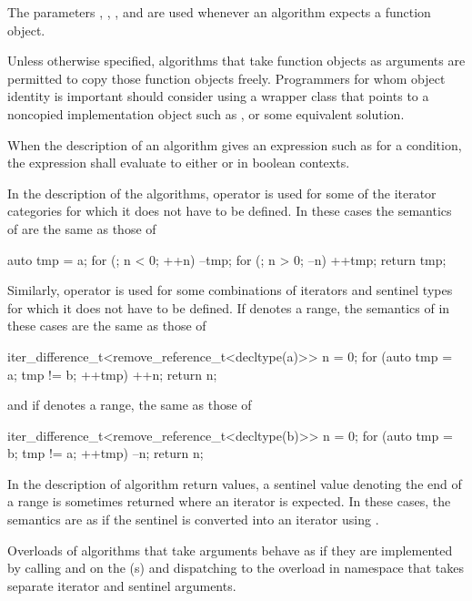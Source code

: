 \pnum
The parameters
,
,
,
and 
are used
whenever an algorithm expects a function object.

\pnum
\begin{note}
Unless otherwise specified, algorithms that take function objects as arguments
are permitted to copy those function objects freely.
Programmers for whom object identity is important should consider
using a wrapper class that points to a noncopied implementation object
such as , or some equivalent solution.
\end{note}

\pnum
When the description of an algorithm gives an expression such as
 for a condition, the expression
shall evaluate to either  or  in boolean contexts.

\pnum
In the description of the algorithms, operator \tcode{+}
is used for some of the iterator categories
for which it does not have to be defined.
In these cases the semantics of  are the same as those of
\begin{codeblock}
auto tmp = a;
for (; n < 0; ++n) --tmp;
for (; n > 0; --n) ++tmp;
return tmp;
\end{codeblock}
Similarly, operator \tcode{-} is used
for some combinations of iterators and sentinel types
for which it does not have to be defined.
If  denotes a range,
the semantics of  in these cases are the same as those of
\begin{codeblock}
iter_difference_t<remove_reference_t<decltype(a)>> n = 0;
for (auto tmp = a; tmp != b; ++tmp) ++n;
return n;
\end{codeblock}
and if  denotes a range, the same as those of
\begin{codeblock}
iter_difference_t<remove_reference_t<decltype(b)>> n = 0;
for (auto tmp = b; tmp != a; ++tmp) --n;
return n;
\end{codeblock}

\pnum
In the description of algorithm return values,
a sentinel value  denoting the end of a range 
is sometimes returned where an iterator is expected.
In these cases,
the semantics are as if the sentinel is converted into an iterator using
.

\pnum
Overloads of algorithms that take  arguments
behave as if they are implemented by calling  and
 on the (s) and
dispatching to the overload in namespace 
that takes separate iterator and sentinel arguments.

